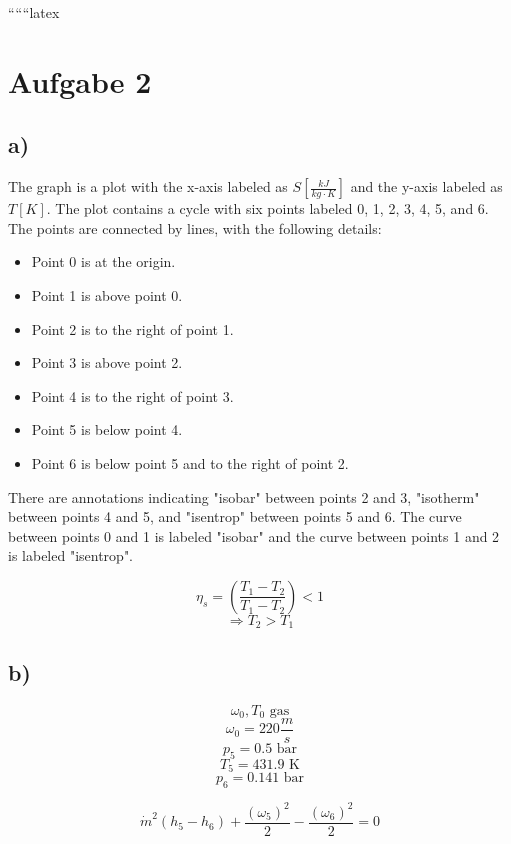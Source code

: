 
``````latex


\section*{Aufgabe 2}

\subsection*{a)}

\begin{center}
\begin{minipage}{0.8\textwidth}
The graph is a plot with the x-axis labeled as $S \left[ \frac{kJ}{kg \cdot K} \right]$ and the y-axis labeled as $T \left[ K \right]$. The plot contains a cycle with six points labeled 0, 1, 2, 3, 4, 5, and 6. The points are connected by lines, with the following details:
\begin{itemize}
    \item Point 0 is at the origin.
    \item Point 1 is above point 0.
    \item Point 2 is to the right of point 1.
    \item Point 3 is above point 2.
    \item Point 4 is to the right of point 3.
    \item Point 5 is below point 4.
    \item Point 6 is below point 5 and to the right of point 2.
\end{itemize}
There are annotations indicating "isobar" between points 2 and 3, "isotherm" between points 4 and 5, and "isentrop" between points 5 and 6. The curve between points 0 and 1 is labeled "isobar" and the curve between points 1 and 2 is labeled "isentrop".
\end{minipage}
\end{center}

\[
\eta_s = \left( \frac{T_1 - T_2}{T_1 - T_2} \right) < 1
\]
\[
\Rightarrow T_2 > T_1
\]

\subsection*{b)}

\[
\omega_0, T_0 \text{ gas}
\]
\[
\omega_0 = 220 \frac{m}{s}
\]
\[
p_5 = 0.5 \text{ bar}
\]
\[
T_5 = 431.9 \text{ K}
\]
\[
p_6 = 0.141 \text{ bar}
\]

\[
\dot{m}^2 (h_5 - h_6) + \frac{(\omega_5)^2}{2} - \frac{(\omega_6)^2}{2} = 0
\]

